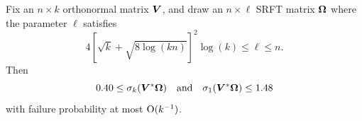 \documentclass[final]{siamltex}
\newcommand{\pgnotate}[1]{{\color{blue}[#1]}}
\newcommand{\notate}[1]{\textcolor{red}{\textbf{[#1]}}}
\begin{document}


%




\lsp

\begin{theorem} \label{thm:SRFT-spec-bd}
Fix an $n \times k$ orthonormal matrix $\bm{V}$, and
draw an $n \times \ell$ SRFT matrix $\bm{\Omega}$
where the parameter $\ell$
satisfies
$$
4 \left[ \sqrt{k} + \sqrt{8\log(kn)} \right]^{2} \log(k) \leq \ell \leq n.
$$
Then
$$
0.40 \leq \sigma_{k}(\bm{V}^* \bm{\Omega})
\quad\text{and}\quad
\sigma_{1}(\bm{V}^* \bm{\Omega}) \leq 1.48
$$
with failure probability at most $\mathrm{O}(k^{-1})$.
\end{theorem}
\end{document}

